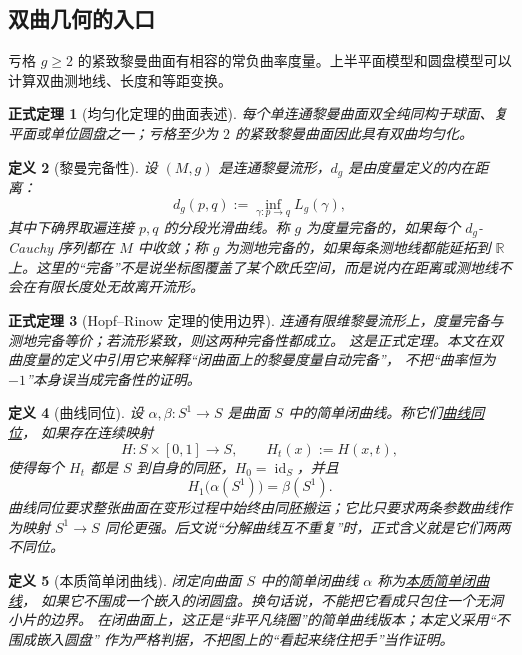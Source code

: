 \documentclass[UTF8,fontset=none,a4paper,11pt]{ctexart}
\theoremstyle{foundation-definition}
\newtheorem{definition}{定义}[section]
\theoremstyle{foundation-theorem}
\newtheorem{theorem}[definition]{正式定理}
\theoremstyle{foundation-proposition}
\theoremstyle{foundation-example}
\theoremstyle{foundation-remark}
\theoremstyle{foundation-theorem}
\newcommand{\term}[2]{\hyperref[#1]{#2}}
\begin{document}
\subsection{双曲几何的入口}

亏格 \(g\geq2\) 的紧致黎曼曲面有相容的常负曲率度量。上半平面模型和圆盘模型可以计算双曲测地线、长度和等距变换。

\begin{theorem}[均匀化定理的曲面表述]\label{thm:uniformization-surface}
每个单连通黎曼曲面双全纯同构于球面、复平面或单位圆盘之一；亏格至少为 \(2\) 的紧致黎曼曲面因此具有双曲均匀化。
\end{theorem}

\begin{definition}[黎曼完备性]\label{def:riemannian-completeness}
设 \((M,g)\) 是连通黎曼流形，\(d_g\) 是由度量定义的内在距离：
\[
d_g(p,q):=\inf_{\gamma:p\to q}L_g(\gamma),
\]
其中下确界取遍连接 \(p,q\) 的分段光滑曲线。称 \(g\) 为度量完备的，如果每个
\(d_g\)-Cauchy 序列都在 \(M\) 中收敛；称 \(g\) 为测地完备的，如果每条测地线都能延拓到
\(\mathbb R\) 上。这里的“完备”不是说坐标图覆盖了某个欧氏空间，而是说内在距离或测地线不会在有限长度处无故离开流形。
\end{definition}

\begin{theorem}[Hopf--Rinow 定理的使用边界]\label{thm:hopf-rinow}
连通有限维黎曼流形上，度量完备与测地完备等价；若流形紧致，则这两种完备性都成立。
这是正式定理。本文在双曲度量的定义中引用它来解释“闭曲面上的黎曼度量自动完备”，
不把“曲率恒为 \(-1\)”本身误当成完备性的证明。
\end{theorem}

\begin{definition}[曲线同位]\label{def:curve-isotopy}
设 \(\alpha,\beta:S^1\to S\) 是曲面 \(S\) 中的简单闭曲线。称它们\term{def:curve-isotopy}{曲线同位}，
如果存在连续映射
\[
H:S\times[0,1]\longrightarrow S,\qquad H_t(x):=H(x,t),
\]
使得每个 \(H_t\) 都是 \(S\) 到自身的同胚，\(H_0=\operatorname{id}_S\)，并且
\[
H_1\bigl(\alpha(S^1)\bigr)=\beta(S^1).
\]
曲线同位要求整张曲面在变形过程中始终由同胚搬运；它比只要求两条参数曲线作为映射
\(S^1\to S\) 同伦更强。后文说“分解曲线互不重复”时，正式含义就是它们两两不同位。
\end{definition}

\begin{definition}[本质简单闭曲线]\label{def:essential-simple-closed-curve}
闭定向曲面 \(S\) 中的简单闭曲线 \(\alpha\) 称为\term{def:essential-simple-closed-curve}{本质简单闭曲线}，
如果它不围成一个嵌入的闭圆盘。换句话说，不能把它看成只包住一个无洞小片的边界。
在闭曲面上，这正是“非平凡绕圈”的简单曲线版本；本定义采用“不围成嵌入圆盘”
作为严格判据，不把图上的“看起来绕住把手”当作证明。
\end{definition}
\end{document}
